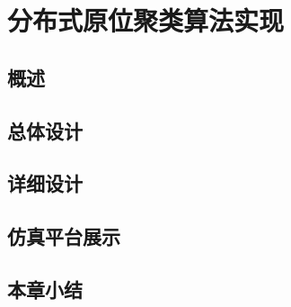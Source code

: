 \chapter{分布式原位聚类算法实现}

\section{概述}

\section{总体设计}

\section{详细设计}

\section{仿真平台展示}

\section{本章小结}